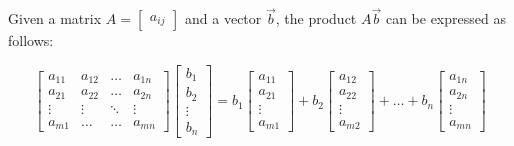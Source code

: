 \documentclass{ximera}
\begin{document}
\begin{general} Given a matrix $A=\begin{bmatrix}a_{ij}\end{bmatrix}$ and a vector $\vec{b}$, the product $A\vec{b}$ can be expressed as follows:

\begin{equation*} \label{eq:matrixvectorproductlincombcols}
 \begin{bmatrix}
           a_{11} & a_{12}&\dots&a_{1n}\\
           a_{21}&a_{22} &\dots &a_{2n}\\
		\vdots & \vdots&\ddots &\vdots\\
		a_{m1}&\dots &\dots &a_{mn}
         \end{bmatrix}
		\begin{bmatrix}
           b_1\\
           b_2\\
		\vdots \\
		b_n
         \end{bmatrix} = b_1\begin{bmatrix}
           a_{11}\\
           a_{21}\\
		\vdots \\
		a_{m1}
         \end{bmatrix}+b_2\begin{bmatrix}
           a_{12}\\
           a_{22}\\
		\vdots \\
		a_{m2}
         \end{bmatrix}+\dots+b_n\begin{bmatrix}
           a_{1n}\\
           a_{2n}\\
		\vdots \\
		a_{mn}
         \end{bmatrix}
\end{equation*}
\end{general}
\end{document}

